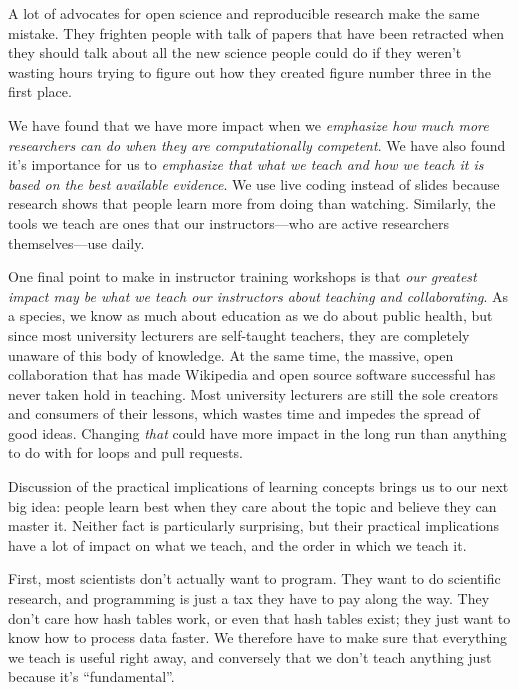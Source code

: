 A lot of advocates for open science and reproducible research make the
same mistake. They frighten people with talk of papers that have been
retracted when they should talk about all the new science people could
do if they weren't wasting hours trying to figure out how they created
figure number three in the first place.

We have found that we have more impact when we \emph{emphasize how much
more researchers can do when they are computationally competent}. We
have also found it's importance for us to \emph{emphasize that what we
teach and how we teach it is based on the best available evidence}. We
use live coding instead of slides because research shows that people
learn more from doing than watching. Similarly, the tools we teach are
ones that our instructors---who are active researchers themselves---use
daily.

One final point to make in instructor training workshops is that
\emph{our greatest impact may be what we teach our instructors about
teaching and collaborating}. As a species, we know as much about
education as we do about public health, but since most university
lecturers are self-taught teachers, they are completely unaware of this
body of knowledge. At the same time, the massive, open collaboration
that has made Wikipedia and open source software successful has never
taken hold in teaching. Most university lecturers are still the sole
creators and consumers of their lessons, which wastes time and impedes
the spread of good ideas. Changing \emph{that} could have more impact in
the long run than anything to do with for loops and pull requests.


Discussion of the practical implications of learning concepts brings us
to our next big idea: people learn best when they care about the topic
and believe they can master it. Neither fact is particularly surprising,
but their practical implications have a lot of impact on what we teach,
and the order in which we teach it.

First, most scientists don't actually want to program. They want to do
scientific research, and programming is just a tax they have to pay
along the way. They don't care how hash tables work, or even that hash
tables exist; they just want to know how to process data faster. We
therefore have to make sure that everything we teach is useful right
away, and conversely that we don't teach anything just because it's
``fundamental''.

